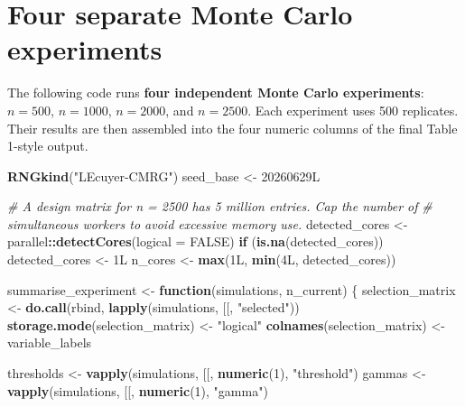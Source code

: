 \documentclass[
]{article}
\newenvironment{Shaded}{\begin{snugshade}}{\end{snugshade}}
\newcommand{\AttributeTok}[1]{\textcolor[rgb]{0.13,0.29,0.53}{#1}}
\newcommand{\CommentTok}[1]{\textcolor[rgb]{0.56,0.35,0.01}{\textit{#1}}}
\newcommand{\ConstantTok}[1]{\textcolor[rgb]{0.56,0.35,0.01}{#1}}
\newcommand{\ControlFlowTok}[1]{\textcolor[rgb]{0.13,0.29,0.53}{\textbf{#1}}}
\newcommand{\DataTypeTok}[1]{\textcolor[rgb]{0.13,0.29,0.53}{#1}}
\newcommand{\DecValTok}[1]{\textcolor[rgb]{0.00,0.00,0.81}{#1}}
\newcommand{\FunctionTok}[1]{\textcolor[rgb]{0.13,0.29,0.53}{\textbf{#1}}}
\newcommand{\NormalTok}[1]{#1}
\newcommand{\OtherTok}[1]{\textcolor[rgb]{0.56,0.35,0.01}{#1}}
\newcommand{\SpecialCharTok}[1]{\textcolor[rgb]{0.81,0.36,0.00}{\textbf{#1}}}
\newcommand{\StringTok}[1]{\textcolor[rgb]{0.31,0.60,0.02}{#1}}
\begin{document}
\section{Four separate Monte Carlo
experiments}\label{four-separate-monte-carlo-experiments}

The following code runs \textbf{four independent Monte Carlo
experiments}: \(n=500\), \(n=1000\), \(n=2000\), and \(n=2500\). Each
experiment uses 500 replicates. Their results are then assembled into
the four numeric columns of the final Table 1-style output.

\begin{Shaded}
\begin{Highlighting}[]
\FunctionTok{RNGkind}\NormalTok{(}\StringTok{"L\textquotesingle{}Ecuyer{-}CMRG"}\NormalTok{)}
\NormalTok{seed\_base }\OtherTok{\textless{}{-}} \DecValTok{20260629}\DataTypeTok{L}

\CommentTok{\# A design matrix for n = 2500 has 5 million entries. Cap the number of}
\CommentTok{\# simultaneous workers to avoid excessive memory use.}
\NormalTok{detected\_cores }\OtherTok{\textless{}{-}}\NormalTok{ parallel}\SpecialCharTok{::}\FunctionTok{detectCores}\NormalTok{(}\AttributeTok{logical =} \ConstantTok{FALSE}\NormalTok{)}
\ControlFlowTok{if}\NormalTok{ (}\FunctionTok{is.na}\NormalTok{(detected\_cores)) detected\_cores }\OtherTok{\textless{}{-}} \DecValTok{1}\DataTypeTok{L}
\NormalTok{n\_cores }\OtherTok{\textless{}{-}} \FunctionTok{max}\NormalTok{(}\DecValTok{1}\DataTypeTok{L}\NormalTok{, }\FunctionTok{min}\NormalTok{(}\DecValTok{4}\DataTypeTok{L}\NormalTok{, detected\_cores))}

\NormalTok{summarise\_experiment }\OtherTok{\textless{}{-}} \ControlFlowTok{function}\NormalTok{(simulations, n\_current) \{}
\NormalTok{  selection\_matrix }\OtherTok{\textless{}{-}} \FunctionTok{do.call}\NormalTok{(rbind, }\FunctionTok{lapply}\NormalTok{(simulations, }\StringTok{\textasciigrave{}}\AttributeTok{[[}\StringTok{\textasciigrave{}}\NormalTok{, }\StringTok{"selected"}\NormalTok{))}
  \FunctionTok{storage.mode}\NormalTok{(selection\_matrix) }\OtherTok{\textless{}{-}} \StringTok{"logical"}
  \FunctionTok{colnames}\NormalTok{(selection\_matrix) }\OtherTok{\textless{}{-}}\NormalTok{ variable\_labels}

\NormalTok{  thresholds }\OtherTok{\textless{}{-}} \FunctionTok{vapply}\NormalTok{(simulations, }\StringTok{\textasciigrave{}}\AttributeTok{[[}\StringTok{\textasciigrave{}}\NormalTok{, }\FunctionTok{numeric}\NormalTok{(}\DecValTok{1}\NormalTok{), }\StringTok{"threshold"}\NormalTok{)}
\NormalTok{  gammas }\OtherTok{\textless{}{-}} \FunctionTok{vapply}\NormalTok{(simulations, }\StringTok{\textasciigrave{}}\AttributeTok{[[}\StringTok{\textasciigrave{}}\NormalTok{, }\FunctionTok{numeric}\NormalTok{(}\DecValTok{1}\NormalTok{), }\StringTok{"gamma"}\NormalTok{)}


\end{Highlighting}
\end{Shaded}
\end{document}
